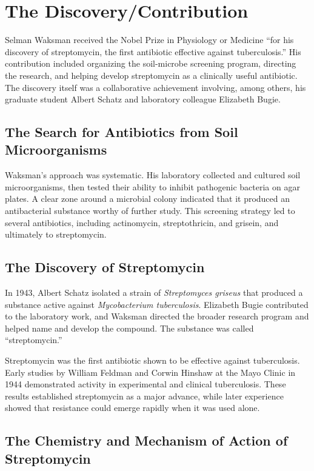 \section{The Discovery/Contribution}

Selman Waksman received the Nobel Prize in Physiology or Medicine ``for his discovery of streptomycin, the first antibiotic effective against tuberculosis.'' His contribution included organizing the soil-microbe screening program, directing the research, and helping develop streptomycin as a clinically useful antibiotic. The discovery itself was a collaborative achievement involving, among others, his graduate student Albert Schatz and laboratory colleague Elizabeth Bugie.

\subsection{The Search for Antibiotics from Soil Microorganisms}

Waksman's approach was systematic. His laboratory collected and cultured soil microorganisms, then tested their ability to inhibit pathogenic bacteria on agar plates. A clear zone around a microbial colony indicated that it produced an antibacterial substance worthy of further study. This screening strategy led to several antibiotics, including actinomycin, streptothricin, and grisein, and ultimately to streptomycin.

\subsection{The Discovery of Streptomycin}

In 1943, Albert Schatz isolated a strain of \textit{Streptomyces griseus} that produced a substance active against \textit{Mycobacterium tuberculosis}. Elizabeth Bugie contributed to the laboratory work, and Waksman directed the broader research program and helped name and develop the compound. The substance was called ``streptomycin.''

Streptomycin was the first antibiotic shown to be effective against tuberculosis. Early studies by William Feldman and Corwin Hinshaw at the Mayo Clinic in 1944 demonstrated activity in experimental and clinical tuberculosis. These results established streptomycin as a major advance, while later experience showed that resistance could emerge rapidly when it was used alone.

\subsection{The Chemistry and Mechanism of Action of Streptomycin}

